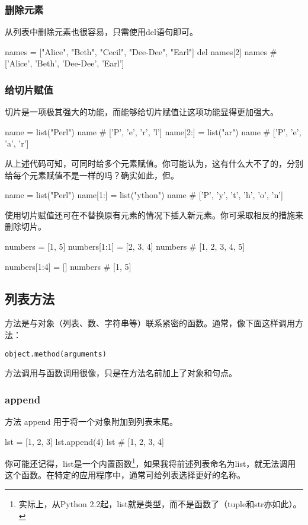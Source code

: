 \subsubsection{删除元素}
从列表中删除元素也很容易，只需使用del语句即可。
\begin{pyc}
names = ["Alice", "Beth", "Cecil", "Dee-Dee", "Earl"]
del names[2]
names  # ['Alice', 'Beth', 'Dee-Dee', 'Earl']
\end{pyc}
\subsubsection{给切片赋值}
切片是一项极其强大的功能，而能够给切片赋值让这项功能显得更加强大。
\begin{pyc}
name = list("Perl")
name  # ['P', 'e', 'r', 'l']
name[2:] = list("ar")
name  # ['P', 'e', 'a', 'r']
\end{pyc}

从上述代码可知，可同时给多个元素赋值。你可能认为，这有什么大不了的，分别给每个元素赋值不是一样的吗？确实如此，但。
\begin{pyc}
name = list("Perl")
name[1:] = list("ython")
name  # ['P', 'y', 't', 'h', 'o', 'n']
\end{pyc}

使用切片赋值还可在不替换原有元素的情况下插入新元素。你可采取相反的措施来删除切片。
\begin{pyc}
numbers = [1, 5]
numbers[1:1] = [2, 3, 4]
numbers  # [1, 2, 3, 4, 5]

numbers[1:4] = []
numbers  # [1, 5]
\end{pyc}

\subsection{列表方法}
方法是与对象（列表、数、字符串等）联系紧密的函数。通常，像下面这样调用方法：

\verb|object.method(arguments)|

方法调用与函数调用很像，只是在方法名前加上了对象和句点。
\subsubsection{append}
方法 append 用于将一个对象附加到列表末尾。

\begin{pyc}
lst = [1, 2, 3]
lst.append(4)
lst  # [1, 2, 3, 4]
\end{pyc}
你可能还记得，list是一个内置函数\footnote{实际上，从Python 2.2起，list就是类型，而不是函数了（tuple和str亦如此）。}，如果我将前述列表命名为list，就无法调用这个函数。在特定的应用程序中，通常可给列表选择更好的名称。

